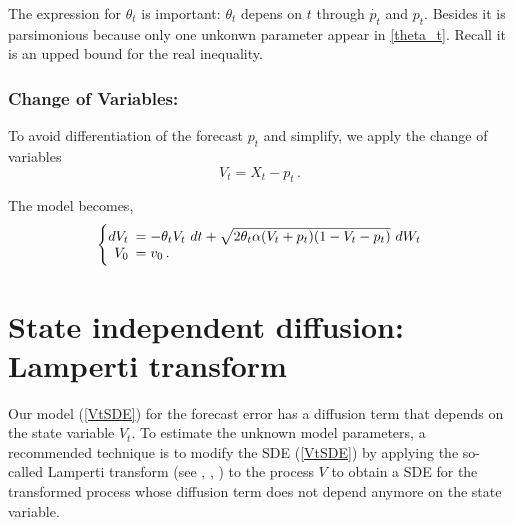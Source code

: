 \documentclass[11pt]{article}
\theoremstyle{definition}
\begin{document}
{\color{red} The expression for $\theta_t$ is important: $\theta_t$ depens on $t$ through $\dot{p_t}$ and $p_t$. Besides it is parsimonious because only one unkonwn parameter appear in \ref{theta_t}. Recall it is an upped bound for the real inequality. } 

\subsubsection*{Change of Variables:}
To avoid differentiation of the forecast $p_t$ and simplify, we apply the change of variables $$V_t = X_t - p_t \,.$$ 

The  model becomes,
\begin{equation}
  \left\{
  \begin{array}{@{}rl@{}}
    dV_t \!\!\!&=  - \theta_t V_t \  dt + \sqrt{2 \theta_t \alpha (V_t +p_t ) (1-V_t-p_t)} \  dW_t   \\ %
V_0 \!\!\!&=  v_0 \,. \label{VtSDE}
\end{array}\right. 
\end{equation}


\section{State independent diffusion: Lamperti transform} \label{Section_3}

Our model (\ref{VtSDE}) for the forecast error has a diffusion term that depends on the state variable $V_t$. To estimate the unknown model parameters, a recommended technique is to modify the SDE (\ref{VtSDE}) by applying the so-called Lamperti transform (see \cite[40--41]{iacus1}, \cite{moma}, \cite[98--100]{saso}) to the process $V$ to obtain a SDE for the transformed process whose diffusion term does not depend anymore on the state variable. \\
\end{document}
